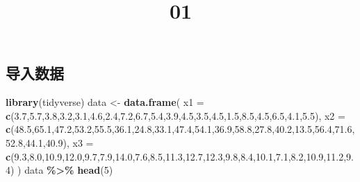 \documentclass[
]{ctexart}
\title{01}
\author{}
\date{\vspace{-2.5em}}
\newenvironment{Shaded}{\begin{snugshade}}{\end{snugshade}}
\newcommand{\AttributeTok}[1]{\textcolor[rgb]{0.13,0.29,0.53}{#1}}
\newcommand{\DecValTok}[1]{\textcolor[rgb]{0.00,0.00,0.81}{#1}}
\newcommand{\FloatTok}[1]{\textcolor[rgb]{0.00,0.00,0.81}{#1}}
\newcommand{\FunctionTok}[1]{\textcolor[rgb]{0.13,0.29,0.53}{\textbf{#1}}}
\newcommand{\NormalTok}[1]{#1}
\newcommand{\OtherTok}[1]{\textcolor[rgb]{0.56,0.35,0.01}{#1}}
\newcommand{\SpecialCharTok}[1]{\textcolor[rgb]{0.81,0.36,0.00}{\textbf{#1}}}
\begin{document}
\maketitle

{
\setcounter{tocdepth}{2}
\tableofcontents
}
\subsection{导入数据}\label{ux5bfcux5165ux6570ux636e}

\begin{Shaded}
\begin{Highlighting}[]
\FunctionTok{library}\NormalTok{(tidyverse)}
\NormalTok{data }\OtherTok{\textless{}{-}} \FunctionTok{data.frame}\NormalTok{(}
  \AttributeTok{x1 =} \FunctionTok{c}\NormalTok{(}\FloatTok{3.7}\NormalTok{,}\FloatTok{5.7}\NormalTok{,}\FloatTok{3.8}\NormalTok{,}\FloatTok{3.2}\NormalTok{,}\FloatTok{3.1}\NormalTok{,}\FloatTok{4.6}\NormalTok{,}\FloatTok{2.4}\NormalTok{,}\FloatTok{7.2}\NormalTok{,}\FloatTok{6.7}\NormalTok{,}\FloatTok{5.4}\NormalTok{,}\FloatTok{3.9}\NormalTok{,}\FloatTok{4.5}\NormalTok{,}\FloatTok{3.5}\NormalTok{,}\FloatTok{4.5}\NormalTok{,}\FloatTok{1.5}\NormalTok{,}\FloatTok{8.5}\NormalTok{,}\FloatTok{4.5}\NormalTok{,}\FloatTok{6.5}\NormalTok{,}\FloatTok{4.1}\NormalTok{,}\FloatTok{5.5}\NormalTok{),}
  \AttributeTok{x2 =} \FunctionTok{c}\NormalTok{(}\FloatTok{48.5}\NormalTok{,}\FloatTok{65.1}\NormalTok{,}\FloatTok{47.2}\NormalTok{,}\FloatTok{53.2}\NormalTok{,}\FloatTok{55.5}\NormalTok{,}\FloatTok{36.1}\NormalTok{,}\FloatTok{24.8}\NormalTok{,}\FloatTok{33.1}\NormalTok{,}\FloatTok{47.4}\NormalTok{,}\FloatTok{54.1}\NormalTok{,}\FloatTok{36.9}\NormalTok{,}\FloatTok{58.8}\NormalTok{,}\FloatTok{27.8}\NormalTok{,}\FloatTok{40.2}\NormalTok{,}\FloatTok{13.5}\NormalTok{,}\FloatTok{56.4}\NormalTok{,}\FloatTok{71.6}\NormalTok{,}\FloatTok{52.8}\NormalTok{,}\FloatTok{44.1}\NormalTok{,}\FloatTok{40.9}\NormalTok{),}
  \AttributeTok{x3 =} \FunctionTok{c}\NormalTok{(}\FloatTok{9.3}\NormalTok{,}\FloatTok{8.0}\NormalTok{,}\FloatTok{10.9}\NormalTok{,}\FloatTok{12.0}\NormalTok{,}\FloatTok{9.7}\NormalTok{,}\FloatTok{7.9}\NormalTok{,}\FloatTok{14.0}\NormalTok{,}\FloatTok{7.6}\NormalTok{,}\FloatTok{8.5}\NormalTok{,}\FloatTok{11.3}\NormalTok{,}\FloatTok{12.7}\NormalTok{,}\FloatTok{12.3}\NormalTok{,}\FloatTok{9.8}\NormalTok{,}\FloatTok{8.4}\NormalTok{,}\FloatTok{10.1}\NormalTok{,}\FloatTok{7.1}\NormalTok{,}\FloatTok{8.2}\NormalTok{,}\FloatTok{10.9}\NormalTok{,}\FloatTok{11.2}\NormalTok{,}\FloatTok{9.4}\NormalTok{)}
\NormalTok{)}
\NormalTok{data }\SpecialCharTok{\%\textgreater{}\%} \FunctionTok{head}\NormalTok{(}\DecValTok{5}\NormalTok{)}
\end{Highlighting}
\end{Shaded}
\end{document}
